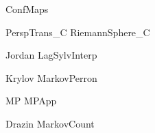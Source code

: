 \documentclass{newsiambook}
\begin{document}


{ConfMaps}

{PerspTrans_C}
{RiemannSphere_C}


\begin{matlab}

\end{matlab}

\begin{python} 

\end{python}



{Jordan}
{LagSylvInterp}

{Krylov}
{MarkovPerron}

{MP}
{MPApp}

{Drazin}
{MarkovCount}


%
\end{document}
